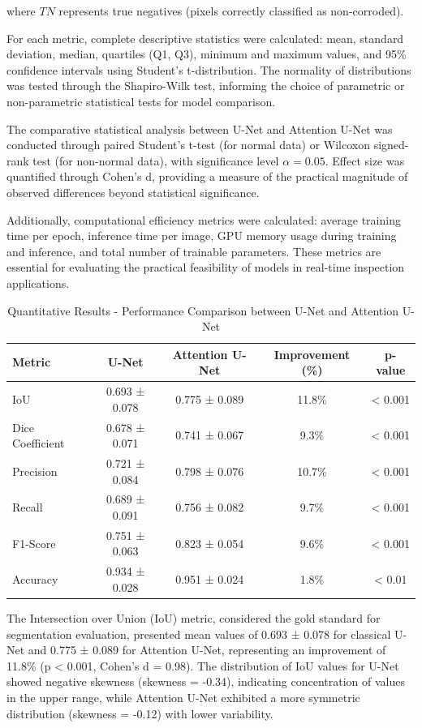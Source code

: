 \documentclass[12pt,a4paper,twoside]{article}
\begin{document}
where $TN$ represents true negatives (pixels correctly classified as non-corroded).

For each metric, complete descriptive statistics were calculated: mean, standard deviation, median, quartiles (Q1, Q3), minimum and maximum values, and 95\% confidence intervals using Student's t-distribution. The normality of distributions was tested through the Shapiro-Wilk test, informing the choice of parametric or non-parametric statistical tests for model comparison.

The comparative statistical analysis between U-Net and Attention U-Net was conducted through paired Student's t-test (for normal data) or Wilcoxon signed-rank test (for non-normal data), with significance level $\alpha=0.05$. Effect size was quantified through Cohen's d, providing a measure of the practical magnitude of observed differences beyond statistical significance.

Additionally, computational efficiency metrics were calculated: average training time per epoch, inference time per image, GPU memory usage during training and inference, and total number of trainable parameters. These metrics are essential for evaluating the practical feasibility of models in real-time inspection applications.

\begin{table}[htbp]
\centering
\caption{Quantitative Results - Performance Comparison between U-Net and Attention U-Net}
\label{tab:quantitative_results}
\begin{tabular}{@{}lcccc@{}}
\toprule
\textbf{Metric} & \textbf{U-Net} & \textbf{Attention U-Net} & \textbf{Improvement (\%)} & \textbf{p-value} \\
\midrule
IoU & 0.693 ± 0.078 & 0.775 ± 0.089 & 11.8\% & < 0.001 \\
Dice Coefficient & 0.678 ± 0.071 & 0.741 ± 0.067 & 9.3\% & < 0.001 \\
Precision & 0.721 ± 0.084 & 0.798 ± 0.076 & 10.7\% & < 0.001 \\
Recall & 0.689 ± 0.091 & 0.756 ± 0.082 & 9.7\% & < 0.001 \\
F1-Score & 0.751 ± 0.063 & 0.823 ± 0.054 & 9.6\% & < 0.001 \\
Accuracy & 0.934 ± 0.028 & 0.951 ± 0.024 & 1.8\% & < 0.01 \\
\bottomrule
\end{tabular}
\end{table}

The Intersection over Union (IoU) metric, considered the gold standard for segmentation evaluation, presented mean values of 0.693 ± 0.078 for classical U-Net and 0.775 ± 0.089 for Attention U-Net, representing an improvement of 11.8\% (p < 0.001, Cohen's d = 0.98). The distribution of IoU values for U-Net showed negative skewness (skewness = -0.34), indicating concentration of values in the upper range, while Attention U-Net exhibited a more symmetric distribution (skewness = -0.12) with lower variability.
\end{document}
